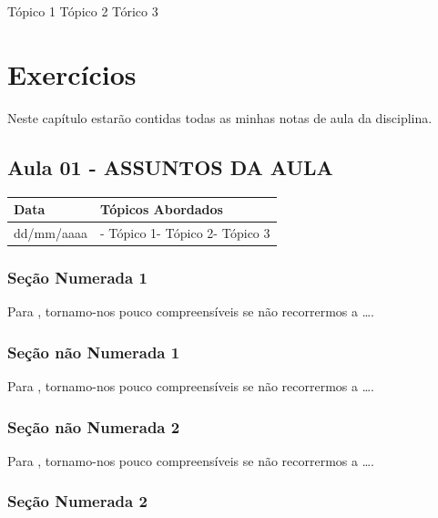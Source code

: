 \documentclass[
]{book}
\begin{document}
Tópico 1
Tópico 2
Tórico 3

\hypertarget{exercuxedcios}{%
\chapter{Exercícios}\label{exercuxedcios}}

Neste capítulo estarão contidas todas as minhas notas de aula da disciplina.

\hypertarget{aula-01---assuntos-da-aula-2}{%
\section{Aula 01 - ASSUNTOS DA AULA}\label{aula-01---assuntos-da-aula-2}}

\begin{longtable}[]{@{}ll@{}}
\toprule()
Data & Tópicos Abordados \\
\midrule()
\endhead
dd/mm/aaaa & - Tópico 1- Tópico 2- Tópico 3 \\
\bottomrule()
\end{longtable}

\hypertarget{seuxe7uxe3o-numerada-1-8}{%
\subsection{Seção Numerada 1}\label{seuxe7uxe3o-numerada-1-8}}

Para \citet{BOCK2001}, tornamo-nos pouco compreensíveis se não recorrermos a \ldots.

\hypertarget{seuxe7uxe3o-nuxe3o-numerada-1-16}{%
\subsection*{Seção não Numerada 1}\label{seuxe7uxe3o-nuxe3o-numerada-1-16}}

Para \citet{BOCK2001}, tornamo-nos pouco compreensíveis se não recorrermos a \ldots.

\hypertarget{seuxe7uxe3o-nuxe3o-numerada-2-24}{%
\subsection*{Seção não Numerada 2}\label{seuxe7uxe3o-nuxe3o-numerada-2-24}}

Para \citet{BOCK2001}, tornamo-nos pouco compreensíveis se não recorrermos a \ldots.

\hypertarget{seuxe7uxe3o-numerada-2-8}{%
\subsection{Seção Numerada 2}\label{seuxe7uxe3o-numerada-2-8}}
\end{document}
